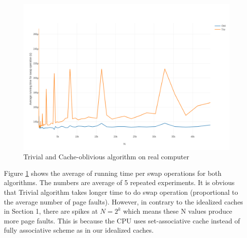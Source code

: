 \documentclass{article}
\begin{document}
\begin{figure}[h!]
\centering
\includegraphics[width=\textwidth]{NTIN066-cache-plot2.png}
\caption{Trivial and Cache-oblivious algorithm on real computer}
\label{fig:plot2}
\end{figure}

Figure \ref{fig:plot2} shows the average of running time per swap operations for both algorithms. The numbers are average of 5 repeated experiments. It is obvious that Trivial algorithm takes longer time to do swap operation (proportional to the average number of page faults). However, in contrary to the idealized caches in Section 1, there are spikes at $N=2^k$ which means these N values produce more page faults. This is because the CPU uses set-associative cache instead of fully associative scheme as in our idealized caches.
\end{document}
